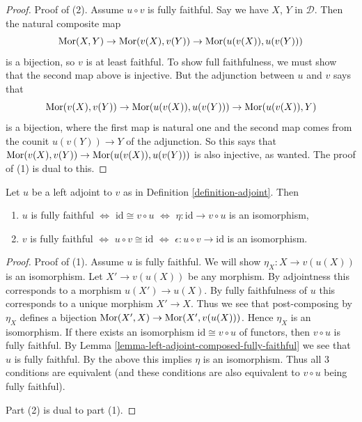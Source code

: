 \begin{proof}
Proof of (2). Assume $u \circ v$ is fully faithful.
Say we have $X$, $Y$ in $\mathcal{D}$.
Then the natural composite map
$$
\mathop{\mathrm{Mor}}\nolimits(X,Y) \to \mathop{\mathrm{Mor}}\nolimits(v(X),v(Y)) \to \mathop{\mathrm{Mor}}\nolimits(u(v(X)), u(v(Y)))
$$
is a bijection, so $v$ is at least faithful. To show full faithfulness,
we must show that the second map above is injective.
But the adjunction between $u$ and $v$ says that
$$
\mathop{\mathrm{Mor}}\nolimits(v(X), v(Y)) \to \mathop{\mathrm{Mor}}\nolimits(u(v(X)), u(v(Y))) \to \mathop{\mathrm{Mor}}\nolimits(u(v(X)), Y)
$$
is a bijection, where the first map is natural one and
the second map comes from the counit $u(v(Y)) \to Y$ of the adjunction.
So this says that
$\mathop{\mathrm{Mor}}\nolimits(v(X), v(Y)) \to \mathop{\mathrm{Mor}}\nolimits(u(v(X)), u(v(Y)))$
is also injective, as wanted. The proof of (1) is dual to this.
\end{proof}

\begin{lemma}
\label{lemma-adjoint-fully-faithful}
Let $u$ be a left adjoint to $v$ as in Definition \ref{definition-adjoint}.
Then
\begin{enumerate}
\item $u$ is fully faithful $\Leftrightarrow$ $\text{id} \cong v \circ u$
$\Leftrightarrow$ $\eta : \text{id} \to v \circ u$ is an isomorphism,
\item $v$ is fully faithful $\Leftrightarrow$
$u \circ v \cong \text{id}$ $\Leftrightarrow$
$\epsilon : u \circ v \to \text{id}$ is an isomorphism.
\end{enumerate}
\end{lemma}

\begin{proof}
Proof of (1).
Assume $u$ is fully faithful. We will show $\eta_X : X \to v(u(X))$
is an isomorphism. Let $X' \to v(u(X))$ be any morphism.
By adjointness this corresponds to a morphism $u(X') \to u(X)$. By fully
faithfulness of $u$ this corresponds to a unique morphism $X' \to X$.
Thus we see that post-composing by $\eta_X$ defines a bijection
$\mathop{\mathrm{Mor}}\nolimits(X', X) \to \mathop{\mathrm{Mor}}\nolimits(X', v(u(X)))$. Hence $\eta_X$ is an isomorphism.
If there exists an isomorphism $\text{id} \cong v \circ u$ of functors,
then $v \circ u$ is fully faithful. By
Lemma \ref{lemma-left-adjoint-composed-fully-faithful} we see
that $u$ is fully faithful. By the above this implies $\eta$
is an isomorphism. Thus all $3$ conditions are equivalent (and these
conditions are also equivalent to $v \circ u$ being fully faithful).

\medskip\noindent
Part (2) is dual to part (1).
\end{proof}

